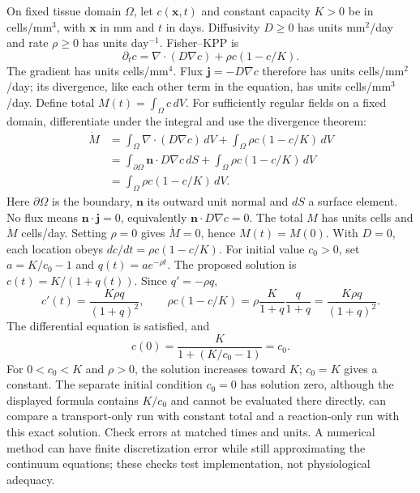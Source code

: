 On fixed tissue domain $\Omega$, let $c(\mathbf x,t)$ and constant capacity $K>0$ be in cells/mm$^3$, with $\mathbf x$ in mm and $t$ in days. Diffusivity $D\geq0$ has units mm$^2$/day and rate $\rho\geq0$ has units day$^{-1}$. Fisher--KPP is
\[
\partial_t c=\nabla\!\cdot(D\nabla c)+\rho c(1-c/K).
\]
The gradient has units cells/mm$^4$. Flux $\mathbf j=-D\nabla c$ therefore has units cells/mm$^2$/day; its divergence, like each other term in the equation, has units cells/mm$^3$/day.
Define total $M(t)=\int_\Omega c\,dV$. For sufficiently regular fields on a fixed domain, differentiate under the integral and use the divergence theorem:
\[
\begin{aligned}
\dot M
&=\int_\Omega\nabla\!\cdot(D\nabla c)\,dV
+\int_\Omega\rho c(1-c/K)\,dV\\
&=\int_{\partial\Omega}\mathbf n\cdot D\nabla c\,dS
+\int_\Omega\rho c(1-c/K)\,dV\\
&=\int_\Omega\rho c(1-c/K)\,dV.
\end{aligned}
\]
Here $\partial\Omega$ is the boundary, $\mathbf n$ its outward unit normal and $dS$ a surface element. No flux means $\mathbf n\cdot\mathbf j=0$, equivalently $\mathbf n\cdot D\nabla c=0$. The total $M$ has units cells and $\dot M$ cells/day. Setting $\rho=0$ gives $\dot M=0$, hence $M(t)=M(0)$.
With $D=0$, each location obeys $dc/dt=\rho c(1-c/K)$. For initial value $c_0>0$, set $a=K/c_0-1$ and $q(t)=a e^{-\rho t}$. The proposed solution is $c(t)=K/(1+q(t))$. Since $q'=-\rho q$,
\[
c'(t)=\frac{K\rho q}{(1+q)^2},\qquad
\rho c(1-c/K)=\rho\frac K{1+q}\frac q{1+q}
=\frac{K\rho q}{(1+q)^2}.
\]
The differential equation is satisfied, and
\[
c(0)=\frac K{1+(K/c_0-1)}=c_0.
\]
For $0<c_0<K$ and $\rho>0$, the solution increases toward $K$; $c_0=K$ gives a constant. The separate initial condition $c_0=0$ has solution zero, although the displayed formula contains $K/c_0$ and cannot be evaluated there directly.
 can compare a transport-only run with constant total and a reaction-only run with this exact solution. Check errors at matched times and units. A numerical method can have finite discretization error while still approximating the continuum equations; these checks test implementation, not physiological adequacy.

